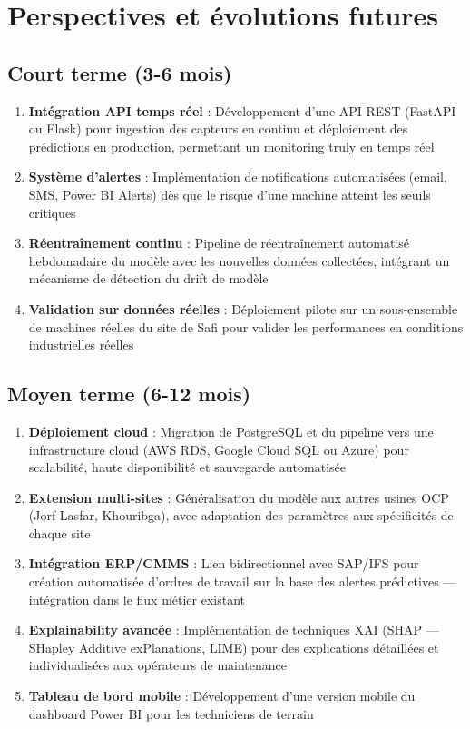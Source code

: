 \documentclass[a4paper,12pt]{report}
\begin{document}
\section{Perspectives et évolutions futures}

\subsection{Court terme (3-6 mois)}

\begin{enumerate}
    \item \textbf{Intégration API temps réel} : Développement d'une API REST (FastAPI ou Flask) pour ingestion des capteurs en continu et déploiement des prédictions en production, permettant un monitoring truly en temps réel
    \item \textbf{Système d'alertes} : Implémentation de notifications automatisées (email, SMS, Power BI Alerts) dès que le risque d'une machine atteint les seuils critiques
    \item \textbf{Réentraînement continu} : Pipeline de réentraînement automatisé hebdomadaire du modèle avec les nouvelles données collectées, intégrant un mécanisme de détection du drift de modèle
    \item \textbf{Validation sur données réelles} : Déploiement pilote sur un sous-ensemble de machines réelles du site de Safi pour valider les performances en conditions industrielles réelles
\end{enumerate}

\subsection{Moyen terme (6-12 mois)}

\begin{enumerate}
    \item \textbf{Déploiement cloud} : Migration de PostgreSQL et du pipeline vers une infrastructure cloud (AWS RDS, Google Cloud SQL ou Azure) pour scalabilité, haute disponibilité et sauvegarde automatisée
    \item \textbf{Extension multi-sites} : Généralisation du modèle aux autres usines OCP (Jorf Lasfar, Khouribga), avec adaptation des paramètres aux spécificités de chaque site
    \item \textbf{Intégration ERP/CMMS} : Lien bidirectionnel avec SAP/IFS pour création automatisée d'ordres de travail sur la base des alertes prédictives — intégration dans le flux métier existant
    \item \textbf{Explainability avancée} : Implémentation de techniques XAI (SHAP — SHapley Additive exPlanations, LIME) pour des explications détaillées et individualisées aux opérateurs de maintenance
    \item \textbf{Tableau de bord mobile} : Développement d'une version mobile du dashboard Power BI pour les techniciens de terrain
\end{enumerate}
\end{document}
